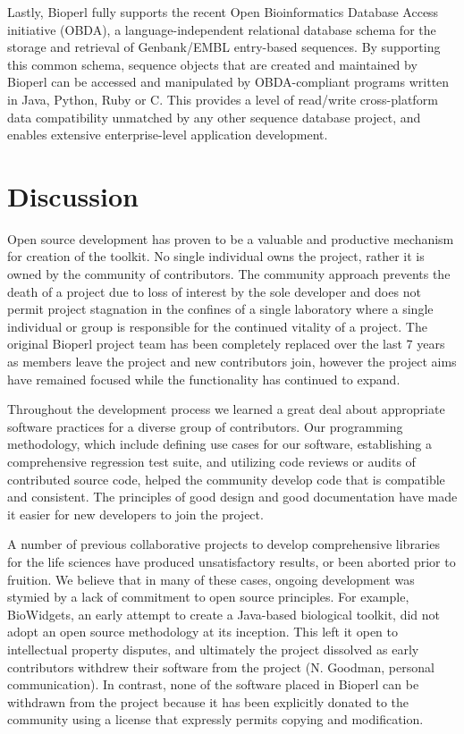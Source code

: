 \documentclass[12pt]{article}
\begin{document}
Lastly, Bioperl fully supports the recent Open Bioinformatics Database
Access initiative (OBDA), a language-independent relational database
schema for the storage and retrieval of Genbank/EMBL entry-based
sequences.  By supporting this common schema, sequence objects that
are created and maintained by Bioperl can be accessed and manipulated
by OBDA-compliant programs written in Java, Python, Ruby or C.  This
provides a level of read/write cross-platform data compatibility
unmatched by any other sequence database project, and enables
extensive enterprise-level application development.

\section{Discussion}

Open source development has proven to be a valuable and productive
mechanism for creation of the toolkit.  No single individual owns the
project, rather it is owned by the community of contributors.  The
community approach prevents the death of a project due to loss of
interest by the sole developer and does not permit project stagnation
in the confines of a single laboratory where a single individual or
group is responsible for the continued vitality of a project.  The
original Bioperl project team has been completely replaced over the
last 7 years as members leave the project and new contributors join,
however the project aims have remained focused while the
functionality has continued to expand.

Throughout the development process we learned a great deal about
appropriate software practices for a diverse group of contributors.
Our programming methodology, which include defining use cases for
our software, establishing a comprehensive regression test suite, and
utilizing code reviews or audits of contributed source code, helped
the community develop code that is compatible and consistent.  The
principles of good design and good documentation have made it easier
for new developers to join the project.

A number of previous collaborative projects to develop comprehensive
libraries for the life sciences have produced unsatisfactory results,
or been aborted prior to fruition.  We believe that in many of these
cases, ongoing development was stymied by a lack of commitment to open
source principles.  For example, BioWidgets, an early attempt to
create a Java-based biological toolkit, did not adopt an open source
methodology at its inception.  This left it open to intellectual
property disputes, and ultimately the project dissolved as early
contributors withdrew their software from the project (N. Goodman,
personal communication).  In contrast, none of the software placed in
Bioperl can be withdrawn from the project because it has been
explicitly donated to the community using a license that expressly
permits copying and modification.
\end{document}
